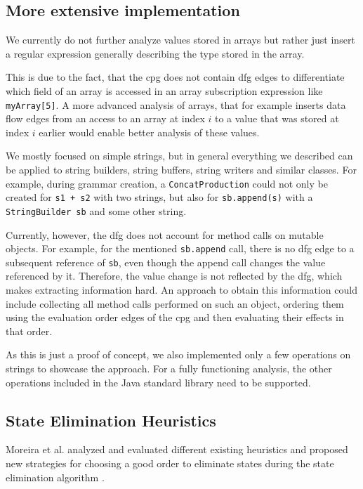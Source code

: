 \subsection{More extensive implementation}

We currently do not further analyze values stored in arrays but rather just insert a regular expression generally describing the type stored in the array.

This is due to the fact, that the \ac{cpg} does not contain \ac{dfg} edges to differentiate which field of an array is accessed in an array subscription expression like \lstinline|myArray[5]|.
A more advanced analysis of arrays, that for example inserts data flow edges from an access to an array at index $i$ to a value that was stored at index $i$ earlier would enable better analysis of these values.

We mostly focused on simple strings, but in general everything we described can be applied to string builders, string buffers, string writers and similar classes. For example, during grammar creation, a \lstinline|ConcatProduction| could not only be created for \lstinline|s1 + s2| with two strings, but also for \lstinline|sb.append(s)| with a \lstinline|StringBuilder sb| and some other string. 

Currently, however, the \ac{dfg} does not account for method calls on mutable objects. For example, for the mentioned \lstinline|sb.append| call, there is no \ac{dfg} edge to a subsequent reference of \lstinline|sb|, even though the append call changes the value referenced by it. Therefore, the value change is not reflected by the \ac{dfg}, which makes extracting information hard. An approach to obtain this information could include collecting all method calls performed on such an object, ordering them using the evaluation order edges of the \ac{cpg} and then evaluating their effects in that order.

As this is just a proof of concept, we also implemented only a few operations on strings to showcase the approach. For a fully functioning analysis, the other operations included in the Java standard library need to be supported.

\subsection{State Elimination Heuristics}

Moreira et al. analyzed and evaluated different existing heuristics and proposed new strategies for choosing a good order to eliminate states during the state elimination algorithm \cite{moreira_heuristics}.

